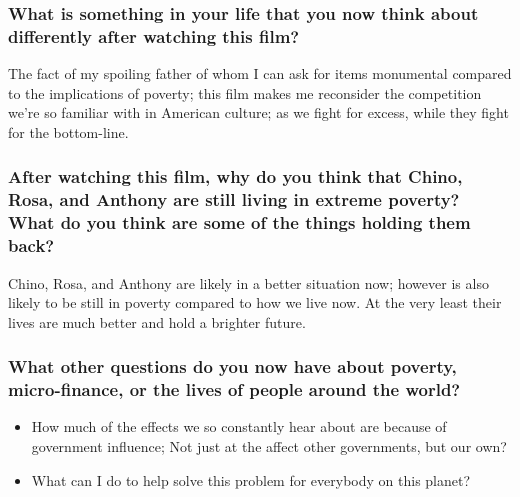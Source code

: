 \documentclass{article}
\begin{document}
\subsubsection*{What is something in your life that you now think about differently after watching this film?}
    \begin{adjustwidth}{24pt}{0in}
        The fact of my spoiling father of whom I can ask for items monumental compared to the implications of poverty;
        this film makes me reconsider the competition we're so familiar with in American culture;
        as we fight for excess, while they fight for the bottom-line.
    \end{adjustwidth}
\subsubsection*{After watching this film, why do you think that Chino, Rosa, and Anthony are still living in extreme poverty? What do you think are some of the things holding them back?}
    \begin{adjustwidth}{24pt}{0in}
        Chino, Rosa, and Anthony are likely in a better situation now; however is also likely to be still in poverty compared to how we live now.
        At the very least their lives are much better and hold a brighter future.
    \end{adjustwidth}
\subsubsection*{What other questions do you now have about poverty, micro-finance, or the lives of people around the world?}
    \begin{adjustwidth}{24pt}{0in}
        \begin{itemize}
        \item{How much of the effects we so constantly hear about are because of government influence; Not just at the affect other governments, but our own?}
        \item{What can I do to help solve this problem for everybody on this planet?}
    \end{itemize}
    \end{adjustwidth}
\end{document}
